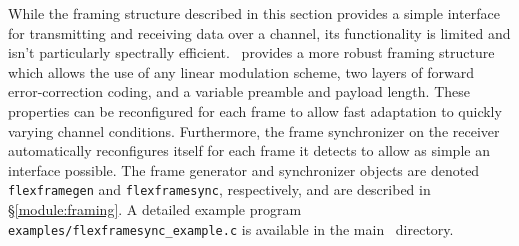 While the framing structure described in this section provides a simple
interface for transmitting and receiving data over a channel,
its functionality is limited and isn't particularly spectrally
efficient.
\liquid\ provides a more robust framing structure which allows the use
of any linear modulation scheme, two layers of forward error-correction
coding, and a variable preamble and payload length.
These properties can be reconfigured for each frame to allow fast
adaptation to quickly varying channel conditions.
Furthermore, the frame synchronizer on the receiver automatically
reconfigures itself for each frame it detects to allow as simple an
interface possible.
The frame generator and synchronizer objects are denoted
{\tt flexframegen} and
{\tt flexframesync},
respectively,
and are described in \S\ref{module:framing}.
A detailed example program {\tt examples/flexframesync\_example.c}
is available in the main \liquid\ directory.

